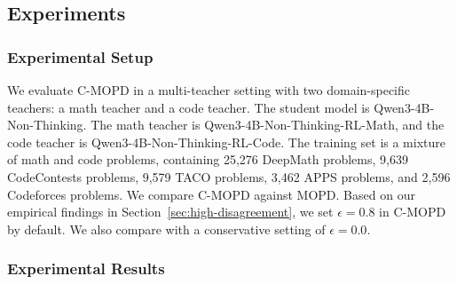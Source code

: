 \documentclass{article}
\theoremstyle{remark}
\begin{document}
\subsection{Experiments}
\label{sec:c-mopd-experiments}

\subsubsection{Experimental Setup}
\label{sec:c-mopd-setup}

We evaluate C-MOPD in a multi-teacher setting with two domain-specific teachers: a math teacher and a code teacher. The student model is Qwen3-4B-Non-Thinking. The math teacher is Qwen3-4B-Non-Thinking-RL-Math, and the code teacher is Qwen3-4B-Non-Thinking-RL-Code. The training set is a mixture of math and code problems, containing 25,276 DeepMath problems, 9,639 CodeContests problems, 9,579 TACO problems, 3,462 APPS problems, and 2,596 Codeforces problems. We compare C-MOPD against MOPD. Based on our empirical findings in Section~\ref{sec:high-disagreement}, we set \(\epsilon=0.8\) in C-MOPD by default. We also compare with a conservative setting of \(\epsilon=0.0\).

\subsubsection{Experimental Results}
\end{document}
